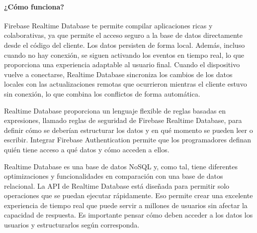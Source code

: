 \paragraph{¿Cómo funciona?}

Firebase Realtime Database te permite compilar aplicaciones ricas 
y colaborativas, ya que permite el acceso seguro a la base de datos
 directamente desde el código del cliente. Los datos persisten de 
forma local. Además, incluso cuando no hay conexión, se siguen 
activando los eventos en tiempo real, lo que proporciona una 
experiencia adaptable al usuario final. Cuando el dispositivo
 vuelve a conectarse, Realtime Database sincroniza los cambios de
 los datos locales con las actualizaciones remotas que ocurrieron
 mientras el cliente estuvo sin conexión, lo que combina los conflictos
 de forma automática.

Realtime Database proporciona un lenguaje flexible de reglas
 basadas en expresiones, llamado reglas de seguridad de Firebase
 Realtime Database, para definir cómo se deberían estructurar los
 datos y en qué momento se pueden leer o escribir. Integrar 
Firebase Authentication permite que los programadores definan 
quién tiene acceso a qué datos y cómo acceden a ellos.

Realtime Database es una base de datos NoSQL y, como tal,
 tiene diferentes optimizaciones y funcionalidades en comparación
 con una base de datos relacional. La API de Realtime Database 
está diseñada para permitir solo operaciones que se puedan
 ejecutar rápidamente. Eso permite crear una excelente 
experiencia de tiempo real que puede servir a millones de usuarios
 sin afectar la capacidad de respuesta. Es importante pensar 
cómo deben acceder a los datos los usuarios y estructurarlos
 según corresponda.